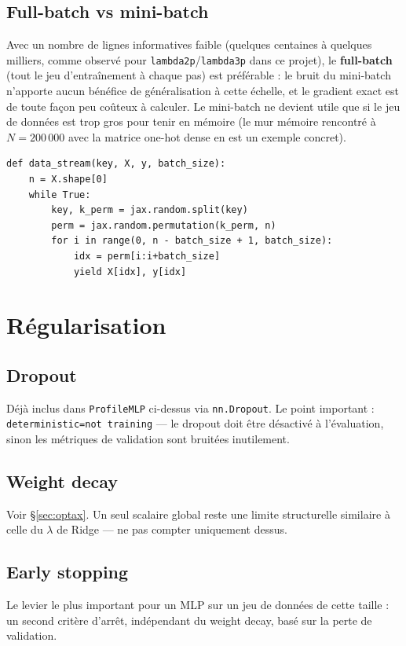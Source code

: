 \documentclass[11pt,a4paper]{article}
\begin{document}
\subsection{Full-batch vs mini-batch}
Avec un nombre de lignes informatives faible (quelques centaines à quelques
milliers, comme observé pour \texttt{lambda2p}/\texttt{lambda3p} dans ce
projet), le \textbf{full-batch} (tout le jeu d'entraînement à chaque pas) est
préférable : le bruit du mini-batch n'apporte aucun bénéfice de
généralisation à cette échelle, et le gradient exact est de toute façon peu
coûteux à calculer. Le mini-batch ne devient utile que si le jeu de données
est trop gros pour tenir en mémoire (le mur mémoire rencontré à $N=200\,000$
avec la matrice one-hot dense en est un exemple concret).

\begin{lstlisting}
def data_stream(key, X, y, batch_size):
    n = X.shape[0]
    while True:
        key, k_perm = jax.random.split(key)
        perm = jax.random.permutation(k_perm, n)
        for i in range(0, n - batch_size + 1, batch_size):
            idx = perm[i:i+batch_size]
            yield X[idx], y[idx]
\end{lstlisting}

\section{Régularisation}

\subsection{Dropout}
Déjà inclus dans \texttt{ProfileMLP} ci-dessus via \texttt{nn.Dropout}. Le
point important : \texttt{deterministic=not training} --- le dropout doit
être désactivé à l'évaluation, sinon les métriques de validation sont
bruitées inutilement.

\subsection{Weight decay}
Voir \S\ref{sec:optax}. Un seul scalaire global reste une limite structurelle
similaire à celle du $\lambda$ de Ridge --- ne pas compter uniquement dessus.

\subsection{Early stopping}
Le levier le plus important pour un MLP sur un jeu de données de cette
taille : un second critère d'arrêt, indépendant du weight decay, basé sur la
perte de validation.
\end{document}
